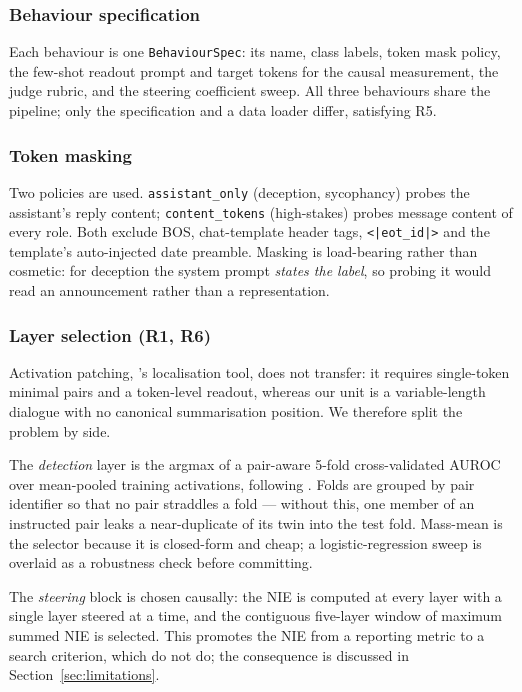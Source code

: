 \documentclass[conference]{IEEEtran}
\begin{document}
\subsubsection{Behaviour specification}
Each behaviour is one \texttt{BehaviourSpec}: its name, class labels, token mask
policy, the few-shot readout prompt and target tokens for the causal
measurement, the judge rubric, and the steering coefficient sweep. All three
behaviours share the pipeline; only the specification and a data loader differ,
satisfying R5.

\subsubsection{Token masking}
Two policies are used. \texttt{assistant\_only} (deception, sycophancy) probes
the assistant's reply content; \texttt{content\_tokens} (high-stakes) probes
message content of every role. Both exclude BOS, chat-template header tags,
\texttt{<|eot\_id|>} and the template's auto-injected date preamble. Masking is
load-bearing rather than cosmetic: for deception the system prompt \emph{states
the label}, so probing it would read an announcement rather than a
representation.

\subsubsection{Layer selection (R1, R6)}
\label{sec:layers}
Activation patching, \citeauthor{marks2024}'s localisation tool, does not
transfer: it requires single-token minimal pairs and a token-level readout,
whereas our unit is a variable-length dialogue with no canonical
summarisation position. We therefore split the problem by side.

The \emph{detection} layer is the argmax of a pair-aware 5-fold
cross-validated AUROC over mean-pooled training activations, following
\citet{mckenzie2025}. Folds are grouped by pair identifier so that no pair
straddles a fold --- without this, one member of an instructed pair leaks a
near-duplicate of its twin into the test fold. Mass-mean is the selector because
it is closed-form and cheap; a logistic-regression sweep is overlaid as a
robustness check before committing.

The \emph{steering} block is chosen causally: the NIE is computed at every layer
with a single layer steered at a time, and the contiguous five-layer window of
maximum summed NIE is selected. This promotes the NIE from a reporting metric to
a search criterion, which \citeauthor{marks2024} do not do; the consequence is
discussed in Section~\ref{sec:limitations}.
\end{document}
